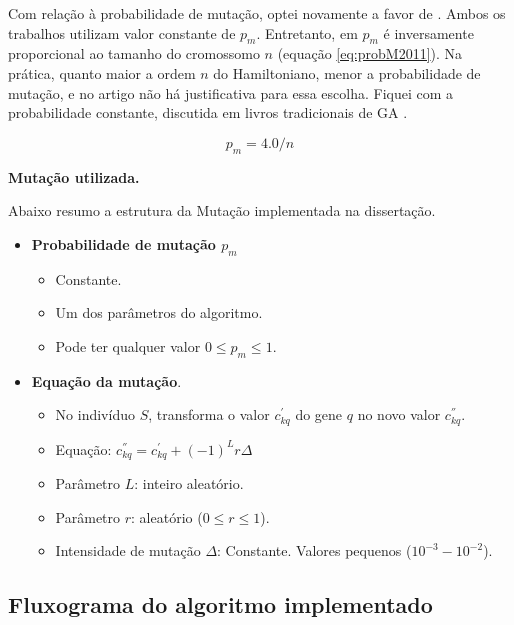 	Com relação à probabilidade de mutação, optei novamente a favor de \cite{metodo2004}. Ambos os trabalhos utilizam valor constante de $p_m$. Entretanto, em \cite{metodo2011} $p_m$ é inversamente proporcional ao tamanho do cromossomo $n$ (equação \ref{eq:probM2011}). Na prática, quanto maior a ordem $n$ do Hamiltoniano, menor a probabilidade de mutação, e no artigo não há justificativa para essa escolha. Fiquei com a probabilidade constante, discutida em livros tradicionais de GA \cite{Mitchell98, Linden2008}.

	\begin{equation}\label{eq:probM2011}
		p_m = 4.0/n
	\end{equation}


	\textbf{Mutação utilizada.}
	
	Abaixo resumo a estrutura da Mutação implementada na dissertação.
	
	
	\begin{itemize}
		\item \textbf{Probabilidade de mutação $p_m$}
			\begin{itemize}
				\item Constante.
				\item Um dos parâmetros do algoritmo.
				\item Pode ter qualquer valor $0 \leq p_m \leq 1$.
			\end{itemize}
		\item \textbf{Equação da mutação}.
			\begin{itemize}
				\item No indivíduo $S$, transforma o valor $c^{'}_{kq}$ do gene $q$ no novo valor $c^{''}_{kq}$.
				\item Equação: $c^{''}_{kq} = c^{'}_{kq} + (-1)^{L} r \Delta$
				\item Parâmetro $L$: inteiro aleatório.
				\item Parâmetro $r$: aleatório ($0 \leq r \leq 1$).
				\item Intensidade de mutação $\Delta$: Constante. Valores pequenos ($10^{-3}-10^{-2}$).
			\end{itemize}
	\end{itemize}
	

\subsection{Fluxograma do algoritmo implementado}

